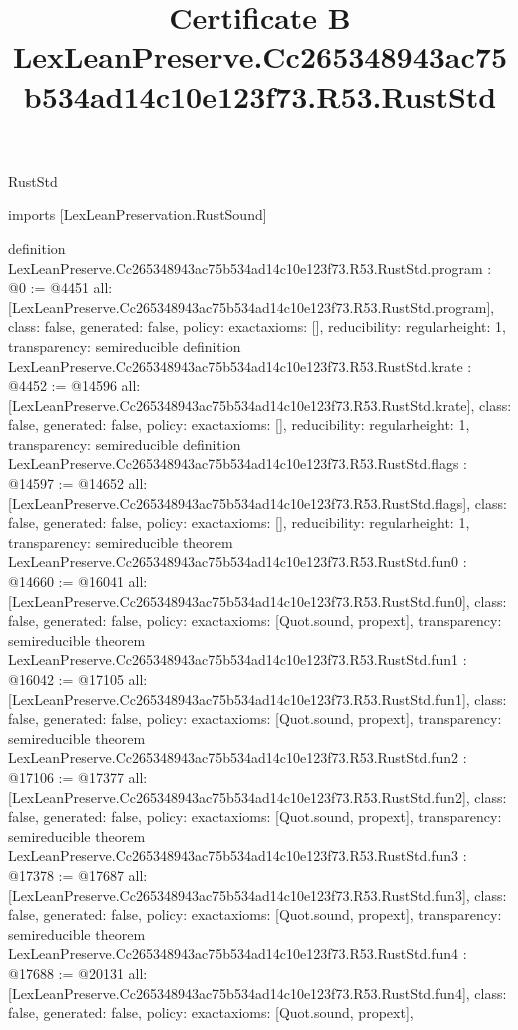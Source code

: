 \begin{lexlean}{RustStd}
\title{Certificate B LexLeanPreserve.Cc265348943ac75b534ad14c10e123f73.R53.RustStd}
\begin{coremodule}
imports [LexLeanPreservation.RustSound]

definition LexLeanPreserve.Cc265348943ac75b534ad14c10e123f73.R53.RustStd.program : @0 := @4451 {
  all: [LexLeanPreserve.Cc265348943ac75b534ad14c10e123f73.R53.RustStd.program],
  class: false,
  generated: false,
  policy: exact{axioms: []},
  reducibility: regular{height: 1},
  transparency: semireducible
}
definition LexLeanPreserve.Cc265348943ac75b534ad14c10e123f73.R53.RustStd.krate : @4452 := @14596 {
  all: [LexLeanPreserve.Cc265348943ac75b534ad14c10e123f73.R53.RustStd.krate],
  class: false,
  generated: false,
  policy: exact{axioms: []},
  reducibility: regular{height: 1},
  transparency: semireducible
}
definition LexLeanPreserve.Cc265348943ac75b534ad14c10e123f73.R53.RustStd.flags : @14597 := @14652 {
  all: [LexLeanPreserve.Cc265348943ac75b534ad14c10e123f73.R53.RustStd.flags],
  class: false,
  generated: false,
  policy: exact{axioms: []},
  reducibility: regular{height: 1},
  transparency: semireducible
}
theorem LexLeanPreserve.Cc265348943ac75b534ad14c10e123f73.R53.RustStd.fun0 : @14660 := @16041 {
  all: [LexLeanPreserve.Cc265348943ac75b534ad14c10e123f73.R53.RustStd.fun0],
  class: false,
  generated: false,
  policy: exact{axioms: [Quot.sound, propext]},
  transparency: semireducible
}
theorem LexLeanPreserve.Cc265348943ac75b534ad14c10e123f73.R53.RustStd.fun1 : @16042 := @17105 {
  all: [LexLeanPreserve.Cc265348943ac75b534ad14c10e123f73.R53.RustStd.fun1],
  class: false,
  generated: false,
  policy: exact{axioms: [Quot.sound, propext]},
  transparency: semireducible
}
theorem LexLeanPreserve.Cc265348943ac75b534ad14c10e123f73.R53.RustStd.fun2 : @17106 := @17377 {
  all: [LexLeanPreserve.Cc265348943ac75b534ad14c10e123f73.R53.RustStd.fun2],
  class: false,
  generated: false,
  policy: exact{axioms: [Quot.sound, propext]},
  transparency: semireducible
}
theorem LexLeanPreserve.Cc265348943ac75b534ad14c10e123f73.R53.RustStd.fun3 : @17378 := @17687 {
  all: [LexLeanPreserve.Cc265348943ac75b534ad14c10e123f73.R53.RustStd.fun3],
  class: false,
  generated: false,
  policy: exact{axioms: [Quot.sound, propext]},
  transparency: semireducible
}
theorem LexLeanPreserve.Cc265348943ac75b534ad14c10e123f73.R53.RustStd.fun4 : @17688 := @20131 {
  all: [LexLeanPreserve.Cc265348943ac75b534ad14c10e123f73.R53.RustStd.fun4],
  class: false,
  generated: false,
  policy: exact{axioms: [Quot.sound, propext]},
}
\end{coremodule}
\end{lexlean}
